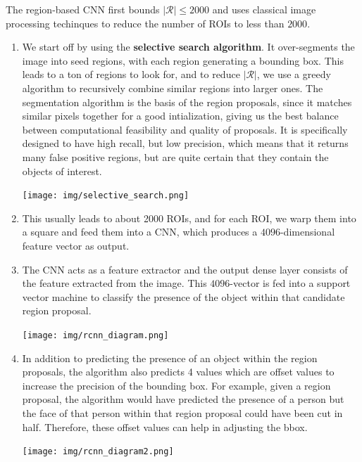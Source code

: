 \documentclass{article}
\theoremstyle{definition}
\theoremstyle{remark}
\theoremstyle{definition}
\begin{document}
    The region-based CNN first bounds $|\mathcal{R}| \leq 2000$ and uses classical image processing techinques to reduce the number of ROIs to less than $2000$. 
    \begin{enumerate} 
      \item We start off by using the \textbf{selective search algorithm}. It over-segments the image into seed regions, with each region generating a bounding box. This leads to a ton of regions to look for, and to reduce $|\mathcal{R}|$, we use a greedy algorithm to recursively combine similar regions into larger ones. The segmentation algorithm is the basis of the region proposals, since it matches similar pixels together for a good intialization, giving us the best balance between computational feasibility and quality of proposals. It is specifically designed to have high recall, but low precision, which means that it returns many false positive regions, but are quite certain that they contain the objects of interest.  
        \begin{center} 
          \texttt{[image: img/selective\_search.png]} 
        \end{center}
      
      \item This usually leads to about 2000 ROIs, and for each ROI, we warp them into a square and feed them into a CNN, which produces a $4096$-dimensional feature vector as output. 

      \item The CNN acts as a feature extractor and the output dense layer consists of the feature extracted from the image. This $4096$-vector is fed into a support vector machine to classify the presence of the object within that candidate region proposal. 
        \begin{center}
          \texttt{[image: img/rcnn\_diagram.png]}
        \end{center}

      \item In addition to predicting the presence of an object within the region proposals, the algorithm also predicts 4 values which are offset values to increase the precision of the bounding box. For example, given a region proposal, the algorithm would have predicted the presence of a person but the face of that person within that region proposal could have been cut in half. Therefore, these offset values can help in adjusting the bbox.  
        \begin{center}
          \texttt{[image: img/rcnn\_diagram2.png]} 
        \end{center}
    \end{enumerate}
\end{document}
